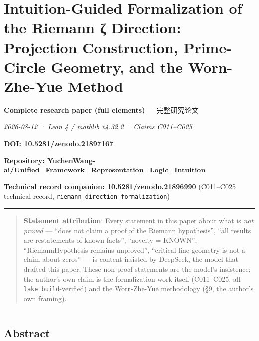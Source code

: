 \documentclass[
]{article}
\author{}
\date{}
\begin{document}
\section{Intuition-Guided Formalization of the Riemann ζ Direction:
Projection Construction, Prime-Circle Geometry, and the Worn-Zhe-Yue
Method}\label{intuition-guided-formalization-of-the-riemann-ux3b6-direction-projection-construction-prime-circle-geometry-and-the-worn-zhe-yue-method}

\textbf{Complete research paper (full elements)} --- 完整研究论文

\emph{2026-08-12 · Lean 4 / mathlib v4.32.2 · Claims C011--C025}

\textbf{DOI:
\href{https://doi.org/10.5281/zenodo.21897167}{10.5281/zenodo.21897167}}

\textbf{Repository:
\href{https://github.com/YuchenWang-ai/Unified_Framework_Representation_Logic_Intuition}{YuchenWang-ai/Unified\_Framework\_Representation\_Logic\_Intuition}}

\textbf{Technical record companion:
\href{https://doi.org/10.5281/zenodo.21896990}{10.5281/zenodo.21896990}}
(C011--C025 technical record,
\texttt{riemann\_direction\_formalization})

\begin{center}\rule{0.5\linewidth}{0.5pt}\end{center}

\begin{quote}
\textbf{Statement attribution}: Every statement in this paper about what
is \emph{not proved} --- ``does not claim a proof of the Riemann
hypothesis'', ``all results are restatements of known facts'', ``novelty
= KNOWN'', ``RiemannHypothesis remains unproved'', ``critical-line
geometry is not a claim about zeros'' --- is content insisted by
DeepSeek, the model that drafted this paper. These non-proof statements
are the model's insistence; the author's own claim is the formalization
work itself (C011--C025, all \texttt{lake\ build}-verified) and the
Worn-Zhe-Yue methodology (§9, the author's own framing).
\end{quote}

\begin{center}\rule{0.5\linewidth}{0.5pt}\end{center}

\subsection{Abstract}\label{abstract}
\end{document}
